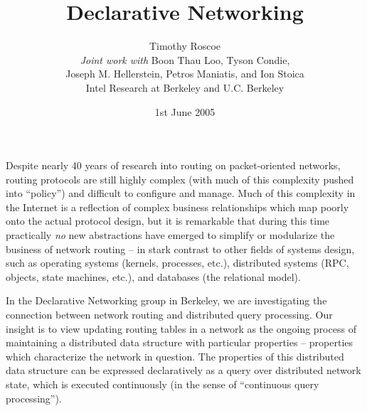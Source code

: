 \documentclass[10pt,twocolumn]{article}
\def\Sys{Declarative Networking\xspace}
\begin{document}

\title{Declarative Networking\xspace}
\author{Timothy Roscoe \\
\textit{Joint work with }
  Boon Thau Loo,
  Tyson Condie,\\
   Joseph M. Hellerstein,
   Petros Maniatis, and
   Ion Stoica\\
Intel Research at Berkeley and U.C. Berkeley}
\date{1st June 2005}
\thispagestyle{empty}
\maketitle
\thispagestyle{empty}




Despite nearly 40 years of research into routing on packet-oriented
networks, routing protocols are still highly complex (with much of this
complexity pushed into ``policy'') and difficult to configure and
manage.  Much of this complexity in the Internet is a reflection of
complex business relationships which map poorly onto the actual protocol
design, but it is remarkable that during this time practically
\emph{no} new abstractions have emerged to simplify or modularize the
business of network routing -- in stark contrast to other fields of
systems design, such as operating systems (kernels, processes, etc.),
distributed systems (RPC, objects, state machines, etc.), and
databases (the relational model). 

In the \Sys group in Berkeley, we are investigating the connection 
between network routing and distributed query processing.  Our
insight is to view updating routing tables in a network as the ongoing
process of maintaining a distributed data structure with particular
properties -- properties which characterize the network in question.
The properties of this distributed data structure can be expressed
declaratively as a query over distributed network state, which is
executed continuously (in the sense of ``continuous query processing'').  
\end{document}
